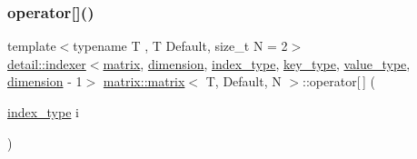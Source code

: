\mbox{\label{structmatrix_1_1matrix_a06d5b697d7f64430305967f4adc80633}} 
\subsubsection{\texorpdfstring{operator[]()}{operator[]()}\hspace{0.1cm}{\footnotesize\ttfamily [1/2]}}
{\footnotesize\ttfamily template$<$typename T , T Default, size\+\_\+t N = 2$>$ \\
\hyperlink{structmatrix_1_1detail_1_1indexer}{detail\+::indexer}$<$\hyperlink{structmatrix_1_1matrix}{matrix}, \hyperlink{structmatrix_1_1matrix_a7d76bd51fd998974f59ea4035e053f74}{dimension}, \hyperlink{structmatrix_1_1matrix_a87b61e7f35dcd5991cd3f243cfeced06}{index\+\_\+type}, \hyperlink{structmatrix_1_1matrix_af7b5498ac1b615cb9ef51bd185a2557e}{key\+\_\+type}, \hyperlink{structmatrix_1_1matrix_ab940e7a84942339cdee7c0f0d3bd8ef9}{value\+\_\+type}, \hyperlink{structmatrix_1_1matrix_a7d76bd51fd998974f59ea4035e053f74}{dimension} -\/ 1$>$ \hyperlink{structmatrix_1_1matrix}{matrix\+::matrix}$<$ T, Default, N $>$\+::operator\mbox{[}$\,$\mbox{]} (\begin{DoxyParamCaption}\item[{\hyperlink{structmatrix_1_1matrix_a87b61e7f35dcd5991cd3f243cfeced06}{index\+\_\+type}}]{i }\end{DoxyParamCaption})\hspace{0.3cm}{\ttfamily [inline]}}

\mbox{\label{structmatrix_1_1matrix_a05ed849b55f74a145d2c5e3a3ba80431}} 
